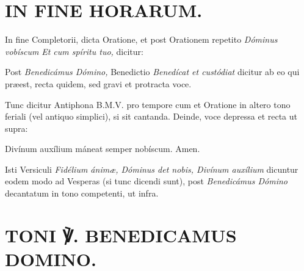 \documentclass[vesperale_romanum.tex]{subfiles}
\begin{document}
\section[In fine Horarum.]{IN FINE HORARUM.}

In fine Completorii, dicta Oratione, et post Orationem repetito \vv \textit{Dóminus vobíscum} \rr \textit{Et cum spíritu tuo,} dicitur:

Post \vv \textit{Benedicámus Dómino,} Benedictio \textit{Benedícat et custódiat} dicitur ab eo qui præest, recta quidem, sed gravi et protracta voce.

Tunc dicitur Antiphona B.M.V. pro tempore cum \vv et Oratione in altero tono feriali (vel antiquo simplici), si sit cantanda. Deinde, voce depressa et recta ut supra:

\vv Divínum auxílium máneat semper nobíscum. \rr Amen.

Isti Versiculi \textit{Fidélium ánimæ, Dóminus det nobis, Divínum auxílium} dicuntur eodem modo ad Vesperas (si tunc dicendi sunt), post \vv \textit{Benedicámus Dómino} decantatum in tono competenti, ut infra.

\section[Toni ℣. Benedicamus Domino.]{TONI ℣. BENEDICAMUS DOMINO.}






%





\end{document}
